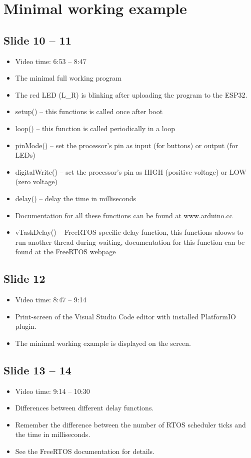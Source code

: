 \documentclass[12pt, a4paper]{article}
\begin{document}
	\section{Minimal working example}
	\subsection{Slide 10 -- 11}
	\begin{itemize}
		\item Video time: 6:53 -- 8:47
		\item The minimal full working program
		\item The red LED (L\_R) is blinking after uploading the program to the ESP32.
		\item setup() -- this functions is called once after boot
		\item loop() -- this function is called periodically in a loop
		\item pinMode() -- set the processor's pin as input (for buttons) or output (for LEDs)
		\item digitalWrite() -- set the processor's pin as HIGH (positive voltage) or LOW (zero voltage)
		\item delay() -- delay the time in milliseconds
		\item Documentation for all these functions can be found at www.arduino.cc
		\item vTaskDelay() -- FreeRTOS specific delay function, this functions aloows to run another thread during waiting, documentation for this function can be found at the FreeRTOS webpage
	\end{itemize}

	\subsection{Slide 12}
	\begin{itemize}
		\item Video time: 8:47 -- 9:14
		\item Print-screen of the Visual Studio Code editor with installed PlatformIO plugin.
		\item The minimal working example is displayed on the screen.
	\end{itemize}

	\subsection{Slide 13 -- 14}
	\begin{itemize}
		\item Video time: 9:14 -- 10:30
		\item Differences between different delay functions.
		\item Remember the difference between the number of RTOS scheduler ticks and the time in milliseconds.
		\item See the FreeRTOS documentation for details.
	\end{itemize}
\end{document}

